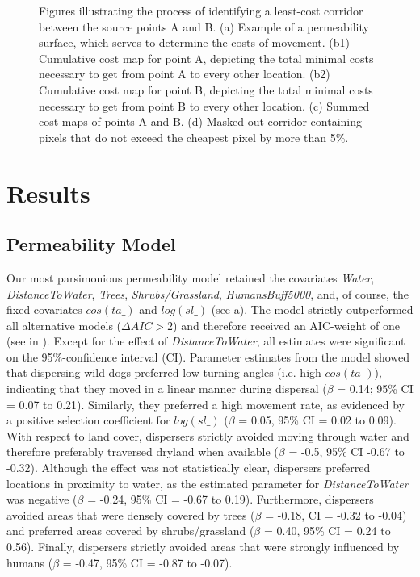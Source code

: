 \documentclass[abstract=on,10pt,a4paper,bibliography=totocnumbered]{scrartcl}
\begin{document}
\begin{figure}[hbtp]
\begin{center}
  \caption{Figures illustrating the process of identifying a least-cost
  corridor between the source points A and B. (a) Example of a permeability
  surface, which serves to determine the costs of movement. (b1) Cumulative
  cost map for point A, depicting the total minimal costs necessary to get
  from point A to every other location. (b2) Cumulative cost map for point B,
  depicting the total minimal costs necessary to get from point B to every
  other location. (c) Summed cost maps of points A and B. (d) Masked out
  corridor containing pixels that do not exceed the cheapest pixel by more
  than 5\%.}
  \label{LCCExample}
  \end{center}
\end{figure}


\newpage
\section{Results}
\subsection{Permeability Model}
Our most parsimonious permeability model retained the covariates \textit{Water},
\textit{DistanceToWater}, \textit{Trees}, \textit{Shrubs/Grassland},
\textit{HumansBuff5000}, and, of course, the fixed covariates \(cos(ta\_)\) and
\(log(sl\_)\) (see a). The model strictly outperformed
all alternative models (\(\Delta AIC > 2\)) and therefore received an AIC-weight
of one (see  in ). Except for the effect of
\textit{DistanceToWater}, all estimates were significant on the 95\%-confidence
interval (CI). Parameter estimates from the model showed that dispersing wild
dogs preferred low turning angles (i.e. high \(cos(ta\_)\)), indicating that
they moved in a linear manner during dispersal (\(\beta\) = 0.14; 95\% CI = 0.07
to 0.21). Similarly, they preferred a high movement rate, as evidenced by a
positive selection coefficient for \(log(sl\_)\) (\(\beta\) = 0.05, 95\% CI =
0.02 to 0.09). With respect to land cover, dispersers strictly avoided moving
through water and therefore preferably traversed dryland when available
(\(\beta\) = -0.5, 95\% CI -0.67 to -0.32). Although the effect was not
statistically clear, dispersers preferred locations in proximity to water, as
the estimated parameter for \textit{DistanceToWater} was negative (\(\beta\) =
-0.24, 95\% CI = -0.67 to 0.19). Furthermore, dispersers avoided areas that were
densely covered by trees (\(\beta\) = -0.18, CI = -0.32 to -0.04) and preferred
areas covered by shrubs/grassland (\(\beta\) = 0.40, 95\% CI = 0.24 to 0.56).
Finally, dispersers strictly avoided areas that were strongly influenced by
humans (\(\beta\) = -0.47, 95\% CI = -0.87 to -0.07).
\end{document}

